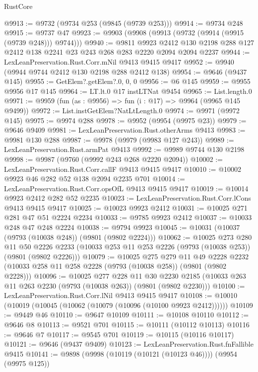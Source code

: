 \begin{lexlean}{RustCore}
\begin{coremodule}
@9913 := @9732 (@9734 @253 (@9845 (@9739 @253)))
@9914 := @9734 @248
@9915 := @9737 @47
@9923 := @9903 (@9908 (@9913 (@9732 (@9914 (@9915 (@9739 @248))) @9744)))
@9940 := @9811
    @9923
    @2412
    @130
    @2198
    @288
    @127
    @2412
    @138
    @2241
    @23
    @243
    @268
    @283
    @2220
    @2094
    @2094
    @2237
@9944 := LexLeanPreservation.Rust.Corr.mNil @9413 @9415 @9417
@9952 := @9940 (@9944 @9744 @2412 @130 @2198 @288 @2412 @138)
@9954 := @9646 (@9437 @145)
@9955 := GetElem?.getElem?.{0, 0, 0}
@9956 := @6 @145
@9959 := @9955 @9956 @17 @145
@9964 := LT.lt.{0} @17 instLTNat @9454
@9965 := List.length.{0}
@9971 := @9959 (fun (as : @9956) => fun (i : @17) => @9964 (@9965 @145 @9499))
@9972 := List.instGetElem?NatLtLength.{0}
@9974 := @9971 (@9972 @145)
@9975 := @9974 @288
@9978 := @9952 (@9954 (@9975 @23))
@9979 := @9646 @9409
@9981 := LexLeanPreservation.Rust.otherArms @9413
@9983 := @9981 @130 @288
@9987 := @9978 (@9979 (@9983 @127 @243))
@9989 := LexLeanPreservation.Rust.armPat @9413
@9992 := @9989 @9744 @130 @2198
@9998 := @9987 (@9760 (@9992 @243 @268 @2220 @2094))
@10002 := LexLeanPreservation.Rust.Corr.callF @9413 @9415 @9417
@10010 := @10002 @9923 @46 @282 @52 @138 @2094 @2235 @701
@10014 := LexLeanPreservation.Rust.Corr.opsOfL @9413 @9415 @9417
@10019 := @10014 @9923 @2412 @282 @52 @2235
@10023 := LexLeanPreservation.Rust.Corr.lCons @9413 @9415 @9417
@10025 := @10023 @9923 @2412
@10031 := @10025 @271 @281 @47 @51 @2224 @2234
@10033 := @9785 @9923 @2412
@10037 := @10033 @248 @47 @248 @2224
@10038 := @9794 @9923
@10045 := @10031 (@10037 (@9793 (@10038 @248)) (@9801 (@9802 @2224)))
@10062 := @10025
    @273
    @280
    @11
    @50
    @2226
    @2233
    (@10033 @253 @11 @253 @2226 (@9793 (@10038 @253)) (@9801 (@9802 @2226)))
@10079 := @10025
    @275
    @279
    @11
    @49
    @2228
    @2232
    (@10033 @258 @11 @258 @2228 (@9793 (@10038 @258)) (@9801 (@9802 @2228)))
@10096 := @10025
    @277
    @228
    @11
    @30
    @2230
    @2185
    (@10033 @263 @11 @263 @2230 (@9793 (@10038 @263)) (@9801 (@9802 @2230)))
@10100 := LexLeanPreservation.Rust.Corr.lNil @9413 @9415 @9417
@10108 := @10010 (@10019 (@10045 (@10062 (@10079 (@10096 (@10100 @9923 @2412))))))
@10109 := @9449 @46
@10110 := @9647 @10109
@10111 := @10108 @10110
@10112 := @9646 @8
@10113 := @9521 @701
@10115 := @10111 (@10112 @10113)
@10116 := @9646 @7
@10117 := @9545 @701
@10119 := @10115 (@10116 @10117)
@10121 := @9646 (@9437 @9409)
@10123 := LexLeanPreservation.Rust.fnFallible @9415
@10141 := @9898
    (@9998 (@10119 (@10121 (@10123 @46))))
    (@9954 (@9975 @125))

\end{coremodule}
\end{lexlean}
